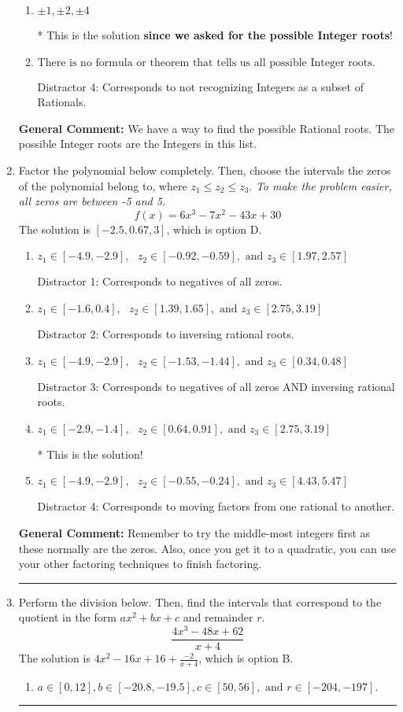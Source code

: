 \documentclass{extbook}[14pt]
\newcommand{\litem}[1]{\item #1

\rule{\textwidth}{0.4pt}}
\begin{document}
\begin{enumerate}
{\begin{enumerate}[label=\Alph*.]
This would have been the solution \textbf{if asked for the possible Rational roots}!
\item \( \pm 1,\pm 2,\pm 4 \)

* This is the solution \textbf{since we asked for the possible Integer roots}!
\item \( \text{There is no formula or theorem that tells us all possible Integer roots.} \)

 Distractor 4: Corresponds to not recognizing Integers as a subset of Rationals.
\end{enumerate}

\textbf{General Comment:} We have a way to find the possible Rational roots. The possible Integer roots are the Integers in this list.
}
\litem{
Factor the polynomial below completely. Then, choose the intervals the zeros of the polynomial belong to, where $z_1 \leq z_2 \leq z_3$. \textit{To make the problem easier, all zeros are between -5 and 5.}
\[ f(x) = 6x^{3} -7 x^{2} -43 x + 30 \]The solution is \( [-2.5, 0.67, 3] \), which is option D.\begin{enumerate}[label=\Alph*.]
\item \( z_1 \in [-4.9, -2.9], \text{   }  z_2 \in [-0.92, -0.59], \text{   and   } z_3 \in [1.97, 2.57] \)

 Distractor 1: Corresponds to negatives of all zeros.
\item \( z_1 \in [-1.6, 0.4], \text{   }  z_2 \in [1.39, 1.65], \text{   and   } z_3 \in [2.75, 3.19] \)

 Distractor 2: Corresponds to inversing rational roots.
\item \( z_1 \in [-4.9, -2.9], \text{   }  z_2 \in [-1.53, -1.44], \text{   and   } z_3 \in [0.34, 0.48] \)

 Distractor 3: Corresponds to negatives of all zeros AND inversing rational roots.
\item \( z_1 \in [-2.9, -1.4], \text{   }  z_2 \in [0.64, 0.91], \text{   and   } z_3 \in [2.75, 3.19] \)

* This is the solution!
\item \( z_1 \in [-4.9, -2.9], \text{   }  z_2 \in [-0.55, -0.24], \text{   and   } z_3 \in [4.43, 5.47] \)

 Distractor 4: Corresponds to moving factors from one rational to another.
\end{enumerate}

\textbf{General Comment:} Remember to try the middle-most integers first as these normally are the zeros. Also, once you get it to a quadratic, you can use your other factoring techniques to finish factoring.
}
\litem{
Perform the division below. Then, find the intervals that correspond to the quotient in the form $ax^2+bx+c$ and remainder $r$.
\[ \frac{4x^{3} -48 x + 62}{x + 4} \]The solution is \( 4x^{2} -16 x + 16 + \frac{-2}{x + 4} \), which is option B.\begin{enumerate}[label=\Alph*.]
\item \( a \in [0, 12], b \in [-20.8, -19.5], c \in [50, 56], \text{ and } r \in [-204, -197]. \)


\end{enumerate}}
\end{enumerate}
\end{document}
